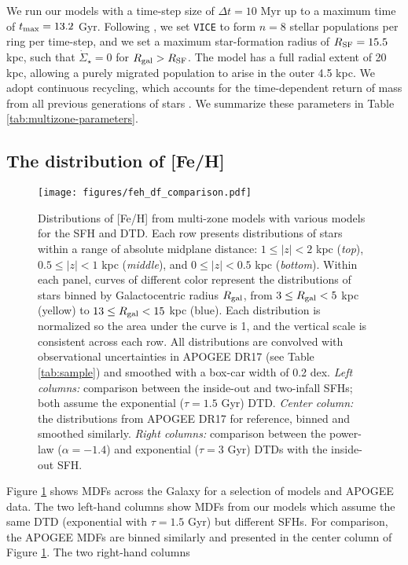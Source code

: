 \documentclass[twocolumn,twocolappendix,linenumbers,trackchanges]{aastex631}
\newcommand{\vice}{{\tt VICE}\xspace}
\begin{document}
We run our models with a time-step size of $\Delta t=10$ Myr up to a maximum time of $t_{\rm max}=13.2$ Gyr. Following , we set \vice to form $n=8$ stellar populations per ring per time-step, and we set a maximum star-formation radius of $R_{\rm SF} = 15.5$ kpc, such that $\dot\Sigma_\star=0$ for $R_{\rm gal}>R_{\rm SF}$. The model has a full radial extent of 20 kpc, allowing a purely migrated population to arise in the outer 4.5 kpc. We adopt continuous recycling, which accounts for the time-dependent return of mass from all previous generations of stars \citep[see Equation 2 from][]{JohnsonWeinberg2020-Starbursts}. We summarize these parameters in Table \ref{tab:multizone-parameters}.

\subsection{The distribution of [Fe/H]}
\label{sec:feh-df}

\begin{figure*}
    \centering
    \texttt{[image: figures/feh\_df\_comparison.pdf]}
    \caption{Distributions of [Fe/H] from multi-zone models with various models for the SFH and DTD. Each row presents distributions of stars within a range of absolute midplane distance: $1\leq|z|<2$ kpc (\textit{top}), $0.5\leq|z|<1$ kpc (\textit{middle}), and $0\leq|z|<0.5$ kpc (\textit{bottom}). Within each panel, curves of different color represent the distributions of stars binned by Galactocentric radius $R_{\rm gal}$, from $3\leq R_{\rm gal}<5$ kpc (yellow) to $13\leq R_{\rm gal}<15$ kpc (blue). Each distribution is normalized so the area under the curve is 1, and the vertical scale is consistent across each row. All distributions are convolved with observational uncertainties in APOGEE DR17 (see Table \ref{tab:sample}) and smoothed with a box-car width of 0.2 dex. 
    \textit{Left columns:} comparison between the inside-out and two-infall SFHs; both assume the exponential ($\tau=1.5$ Gyr) DTD. 
    \textit{Center column:} the distributions from APOGEE DR17 for reference, binned and smoothed similarly.
    \textit{Right columns:} comparison between the power-law ($\alpha=-1.4$) and exponential ($\tau=3$ Gyr) DTDs with the inside-out SFH.}
    \label{fig:feh-df-comparison}
\end{figure*}

Figure \ref{fig:feh-df-comparison} shows MDFs across the Galaxy for a selection of models and APOGEE data. The two left-hand columns show MDFs from our models which assume the same DTD (exponential with $\tau=1.5$ Gyr) but different SFHs. For comparison, the APOGEE MDFs are binned similarly and presented in the center column of Figure \ref{fig:feh-df-comparison}.  The two right-hand columns
\end{document}
